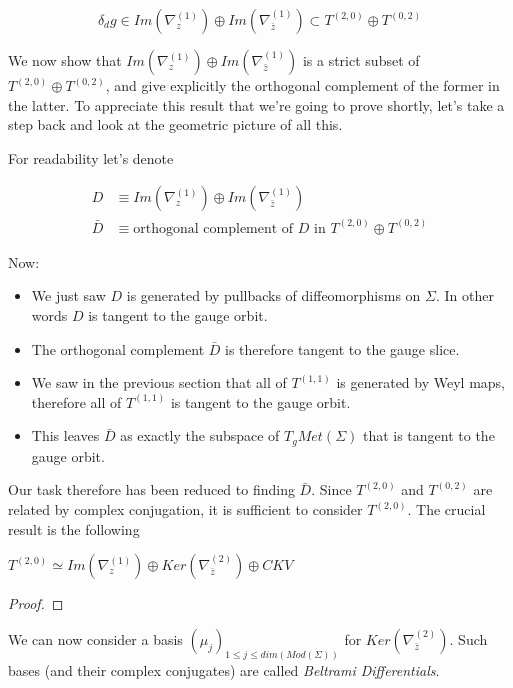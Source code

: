     \begin{equation}
        \delta_d g \in Im(\nabla_z^{(1)}) \oplus Im(\nabla_{\bar z}^{(1)})
        \subset T^{(2,0)} \oplus T^{(0,2)}
    \end{equation}

    We now show that $Im(\nabla_z^{(1)}) \oplus Im(\nabla_{\bar z}^{(1)})$ is a strict subset of $T^{(2,0)} \oplus T^{(0,2)}$, and give explicitly the orthogonal complement of the former in the latter. To appreciate this result that we're going to prove shortly, let's take a step back and look at the geometric picture of all this.

    For readability let's denote

    \begin{align}
        D &\equiv Im(\nabla_z^{(1)}) \oplus Im(\nabla_{\bar z}^{(1)}) \\
        \bar D &\equiv \text{orthogonal complement of } D \text{ in } T^{(2,0)} \oplus T^{(0,2)}
    \end{align}

    Now:

    \begin{itemize}
        \item We just saw $D$ is generated by pullbacks of diffeomorphisms on $\Sigma$. In other words $D$ is tangent to the gauge orbit.
        \item The orthogonal complement $\bar D$ is therefore tangent to the gauge slice.
        \item We saw in the previous section that all of $T^{(1,1)}$ is generated by Weyl maps, therefore all of $T^{(1,1)}$ is tangent to the gauge orbit.
        \item This leaves $\bar D$ as exactly the subspace of $T_g Met(\Sigma)$ that is tangent to the gauge orbit.
    \end{itemize}


    Our task therefore has been reduced to finding $\bar D$. Since $T^{(2, 0)}$ and $T^{(0, 2)}$ are related by complex conjugation, it is sufficient to consider $T^{(2, 0)}$. The crucial result is the following

    \begin{prop}
        $T^{(2,0)} \simeq Im(\nabla^{(1)}_z) \oplus Ker(\nabla^{(2)}_{\bar z}) \oplus CKV$
    \end{prop}

    \begin{proof}
    \end{proof}


    We can now consider a basis $(\mu_j)_{1 \le j \le dim(Mod(\Sigma))}$ for $Ker(\nabla^{(2)}_{\bar z})$. Such bases (and their complex conjugates) are called \textit{Beltrami Differentials}.